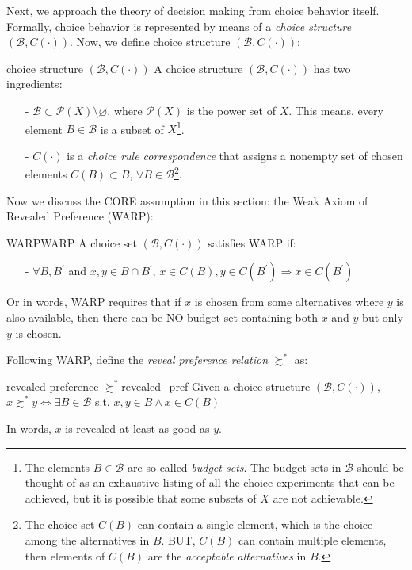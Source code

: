 Next, we approach the theory of decision making from choice behavior itself. Formally, choice behavior is represented by means of a \textit{choice structure} $(\mathcal{B},C(\cdot))$. Now, we define choice structure $(\mathcal{B},C(\cdot))$:
\begin{definition}{choice structure $(\mathcal{B},C(\cdot))$}{}
    A choice structure $(\mathcal{B},C(\cdot))$ has two ingredients:
    \begin{enumerate}
        \item[-] $\mathcal{B}\subset \mathcal{P}(X)\setminus\varnothing$, where $\mathcal{P}(X)$ is the power set of $X$. This means, every element $B\in \mathcal{B}$ is a subset of $X$\footnote{The elements $B\in\mathcal{B}$ are so-called \textit{budget sets}. The budget sets in $\mathcal{B}$ should be thought of as an exhaustive listing of all the choice experiments that can be achieved, but it is possible that some subsets of $X$ are not achievable.}.
        \item[-] $C(\cdot)$ is a \textit{choice rule correspondence} that assigns a nonempty set of chosen elements $C(B)\subset B$, $\forall B\in \mathcal{B}$\footnote{The choice set $C(B)$ can contain a single element, which is the choice among the alternatives in $B$. BUT, $C(B)$ can contain multiple elements, then elements of $C(B)$ are the \textit{acceptable alternatives} in $B$.}.
    \end{enumerate}
\end{definition}

Now we discuss the CORE assumption in this section: the Weak Axiom of Revealed Preference (WARP):
\begin{definition}{WARP}{WARP}
    A choice set $(\mathcal{B},C(\cdot))$ satisfies WARP if:
    \begin{enumerate}
        \item[-] $\forall B,B^{\prime}$ and $x,y\in B\cap B^{\prime}$, $x\in C(B),y\in C(B^{\prime})\Rightarrow x\in C(B^{\prime})$
    \end{enumerate}
\end{definition}

Or in words, WARP requires that if $x$ is chosen from some alternatives where $y$ is also available, then there can be NO budget set containing both $x$ and $y$
but only $y$ is chosen.

Following WARP, define the \textit{reveal preference relation} $\succsim^*$ as:
\begin{definition}{revealed preference $\succsim^*$}{revealed_pref}
    Given a choice structure $(\mathcal{B},C(\cdot))$, $x\succsim^*y\Leftrightarrow \exists B\in\mathcal{B}$ s.t. $x,y\in B\land x\in C(B)$
\end{definition}
In words, $x$ is revealed at least as good as $y$.

